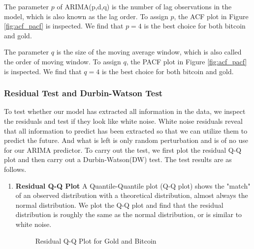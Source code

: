 \documentclass[12pt,a4paper]{article}
\newcommand{\Predictor}{ARIMA }
\begin{document}
\begin{spacing}{1.2}
The parameter $p$ of ARIMA(p,d,q) is the number of lag observations in the model, which is also known as the lag order. To assign $p$, the ACF plot in Figure \ref{fig:acf_pacf} is inspected. We find that $p=4$ is the best choice for both bitcoin and gold.

The parameter $q$ is the size of the moving average window, which is also called the order of moving window. To assign $q$, the PACF plot in Figure \ref{fig:acf_pacf} is inspected. We find that $q=4$ is the best choice for both bitcoin and gold.


\subsubsection{Residual Test and Durbin-Watson Test}
To test whether our model has extracted all information in the data, we inspect the residuals and test if they look like white noise. White noise residuals reveal that all information to predict has been extracted so that we can utilize them to predict the future. And what is left is only random perturbation and is of no use for our \Predictor predictor. To carry out the test, we first plot the residual Q-Q plot and then carry out a Durbin-Watson(DW) test. The test results are as follows.

\begin{enumerate}
	\item \textbf{Residual Q-Q Plot}
	A Quantile-Quantile plot (Q-Q plot) shows the "match" of an observed distribution with a theoretical distribution, almost always the normal distribution. We plot the Q-Q plot and find that the residual distribution is roughly the same as the normal distribution, or is similar to white noise.
	
	\begin{figure}
		\begin{center}
		\end{center}
			\caption{Residual Q-Q Plot for Gold and Bitcoin}
		\label{fig:qq_plot}
	\end{figure}


\end{enumerate}
\end{spacing}
\end{document}
